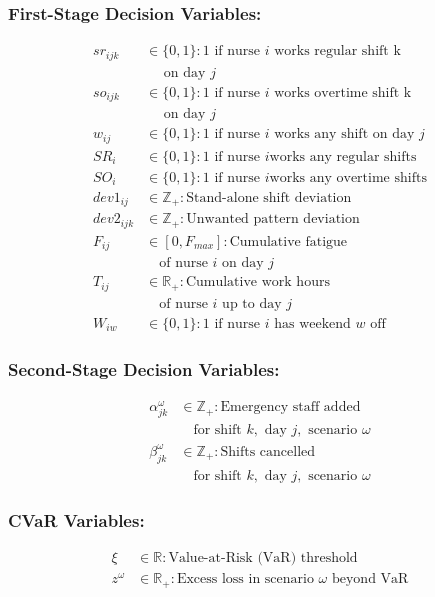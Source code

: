 \documentclass[10pt,a4paper,twocolumn]{article}
\begin{document}
\subsubsection{First-Stage Decision Variables:}
\begin{align*}
sr_{ijk} &\in \{0,1\} : \text{1 if nurse } i \text{ works regular shift k} \\
&\quad \text{ on day } j \\
so_{ijk} &\in \{0,1\} : \text{1 if nurse } i \text{ works overtime shift k} \\
&\quad  \text{ on day } j \\
w_{ij} &\in \{0,1\} : \text{1 if nurse } i \text{ works any shift on day } j \\
SR_i &\in \{0,1\} : \text{1 if nurse } i \text{works any regular shifts} \\
SO_i &\in \{0,1\} : \text{1 if nurse } i \text{works any overtime shifts} \\
dev1_{ij} &\in \mathbb{Z}_+ : \text{Stand-alone shift deviation} \\
dev2_{ijk} &\in \mathbb{Z}_+ : \text{Unwanted pattern deviation} \\
F_{ij} &\in [0, F_{max}] : \text{Cumulative fatigue} \\
&\quad \text{of nurse } i \text{ on day } j \\
T_{ij} &\in \mathbb{R}_+ : \text{Cumulative work hours} \\
&\quad \text{of nurse } i \text{ up to day } j \\
W_{iw} &\in \{0, 1\} : \text{1 if nurse } i \text{ has weekend } w \text{ off}
\end{align*}

\subsubsection{Second-Stage Decision    Variables:}
\begin{align*}
\alpha_{jk}^{\omega} &\in \mathbb{Z}_+ : \text{Emergency staff added} \\
&\quad \text{for shift } k, \text{ day } j, \text{ scenario } \omega \\
\beta_{jk}^{\omega} &\in \mathbb{Z}_+ : \text{Shifts cancelled} \\
&\quad \text{for shift } k, \text{ day } j, \text{ scenario } \omega
\end{align*}

\subsubsection{CVaR Variables:}
\begin{align*}
\xi &\in \mathbb{R} : \text{Value-at-Risk (VaR) threshold} \\
z^{\omega} &\in \mathbb{R}_+ : \text{Excess loss in scenario } \omega \text{ beyond VaR}
\end{align*}
\end{document}
